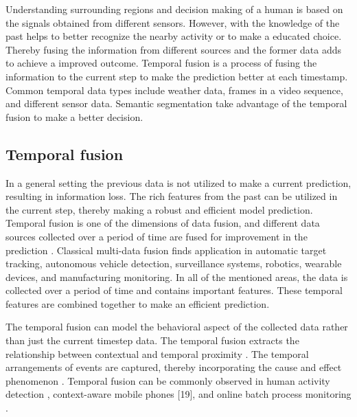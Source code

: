     Understanding surrounding regions and decision making of a human is based on the signals obtained from different sensors. However, with the knowledge of the past helps to better recognize the nearby activity or to make a educated choice. Thereby fusing the information from different sources and the former data adds to achieve a improved outcome. Temporal fusion is a process of fusing the information to the current step to make the prediction better at each timestamp. Common temporal data types include weather data, frames in a video sequence, and different sensor data. Semantic segmentation take advantage of the temporal fusion to make a better decision. 
    
    \subsection{Temporal fusion}
	
    In a general setting the previous data is not utilized to make a current prediction, resulting in information loss. The rich features from the past can be utilized in the current step, thereby making a robust and efficient model prediction. Temporal fusion is one of the dimensions of data fusion, and different data sources collected over a period of time are fused for improvement in the prediction \cite{005_hsiao2005temporal}. Classical multi-data fusion finds application in automatic target tracking, autonomous vehicle detection, surveillance systems, robotics, wearable devices, and manufacturing monitoring. In all of the mentioned areas, the data is collected over a period of time and contains important features. These temporal features are combined together to make an efficient prediction. 
    
    The temporal fusion can model the behavioral aspect of the collected data rather than just the current timestep data. The temporal fusion extracts the relationship between contextual and temporal proximity \cite{07_hsiao2005temporal}. The temporal arrangements of events are captured, thereby incorporating the cause and effect phenomenon \cite{07_hsiao2005temporal}. Temporal fusion can be commonly observed in human activity detection \cite{08_krause2003unsupervised}, context-aware mobile phones [19], and online batch process monitoring \cite{09_lee2003line}. 
    
